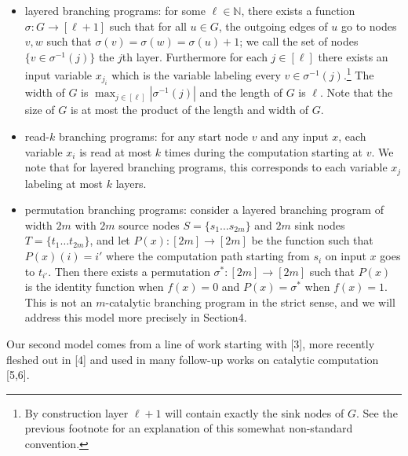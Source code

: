 \begin{itemize}
\item layered branching programs: for some $\ell\in\mathbb N$, there exists a function $\sigma:G\to[\ell+1]$ such that for all $u\in G$, the outgoing edges of $u$ go to nodes $v,w$ such that $\sigma(v)=\sigma(w)=\sigma(u)+1$; we call the set of nodes $\{v\in\sigma^{-1}(j)\}$ the $j$th layer. Furthermore for each $j\in[\ell]$ there exists an input variable $x_{j_i}$ which is the variable labeling every $v\in\sigma^{-1}(j)$.\footnote{By construction layer $\ell+1$ will contain exactly the sink nodes of $G$. See the previous footnote for an explanation of this somewhat non-standard convention.} The width of $G$ is $\max_{j\in[\ell]}|\sigma^{-1}(j)|$ and the length of $G$ is $\ell$. Note that the size of $G$ is at most the product of the length and width of $G$.
\item read-$k$ branching programs: for any start node $v$ and any input $x$, each variable $x_i$ is read at most $k$ times during the computation starting at $v$. We note that for layered branching programs, this corresponds to each variable $x_j$ labeling at most $k$ layers.
\item permutation branching programs: consider a layered branching program of width $2m$ with $2m$ source nodes $S=\{s_1\ldots s_{2m}\}$ and $2m$ sink nodes $T=\{t_1\ldots t_{2m}\}$, and let $P(x):[2m]\to[2m]$ be the function such that $P(x)(i)=i'$ where the computation path starting from $s_i$ on input $x$ goes to $t_{i'}$. Then there exists a permutation $\sigma^*:[2m]\to[2m]$ such that $P(x)$ is the identity function when $f(x)=0$ and $P(x)=\sigma^*$ when $f(x)=1$. This is not an $m$-catalytic branching program in the strict sense, and we will address this model more precisely in Section4.
\end{itemize}
Our second model comes from a line of work starting with [3], more recently fleshed out in [4] and used in many follow-up works on catalytic computation [5,6].
